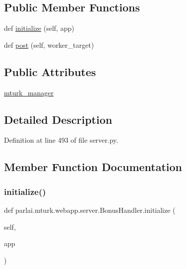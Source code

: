 \subsection*{Public Member Functions}
\begin{DoxyCompactItemize}
\item 
def \hyperlink{classparlai_1_1mturk_1_1webapp_1_1server_1_1BonusHandler_aa29383ea72a9d3e93e75a0689bc6db1e}{initialize} (self, app)
\item 
def \hyperlink{classparlai_1_1mturk_1_1webapp_1_1server_1_1BonusHandler_acdeaf6529109287285903ed8babe864c}{post} (self, worker\+\_\+target)
\end{DoxyCompactItemize}
\subsection*{Public Attributes}
\begin{DoxyCompactItemize}
\item 
\hyperlink{classparlai_1_1mturk_1_1webapp_1_1server_1_1BonusHandler_a9cfd41f9f9ca83eae4d3f8d5f54b8d03}{mturk\+\_\+manager}
\end{DoxyCompactItemize}


\subsection{Detailed Description}


Definition at line 493 of file server.\+py.



\subsection{Member Function Documentation}
\mbox{\label{classparlai_1_1mturk_1_1webapp_1_1server_1_1BonusHandler_aa29383ea72a9d3e93e75a0689bc6db1e}} 
\subsubsection{\texorpdfstring{initialize()}{initialize()}}
{\footnotesize\ttfamily def parlai.\+mturk.\+webapp.\+server.\+Bonus\+Handler.\+initialize (\begin{DoxyParamCaption}\item[{}]{self,  }\item[{}]{app }\end{DoxyParamCaption})}



